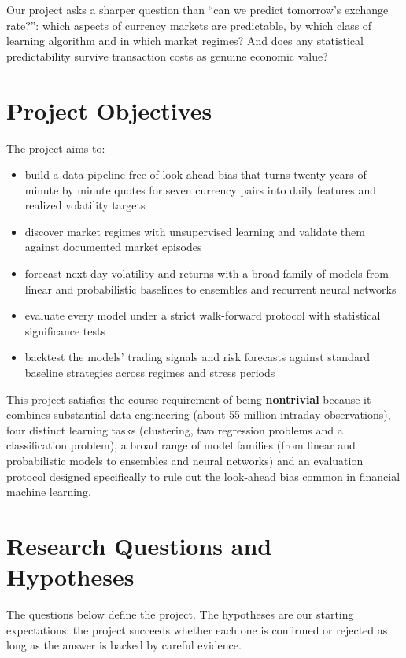 \documentclass[11pt,a4paper]{article}
\begin{document}
Our project asks a sharper question than ``can we predict tomorrow's exchange rate?'': which aspects of currency markets are predictable, by which class of learning algorithm and in which market regimes? And does any statistical predictability survive transaction costs as genuine economic value?

\section*{Project Objectives}
The project aims to:
\begin{itemize}
  \item build a data pipeline free of look-ahead bias that turns twenty years of minute by minute quotes for seven currency pairs into daily features and realized volatility targets
  \item discover market regimes with unsupervised learning and validate them against documented market episodes
  \item forecast next day volatility and returns with a broad family of models from linear and probabilistic baselines to ensembles and recurrent neural networks
  \item evaluate every model under a strict walk-forward protocol with statistical significance tests
  \item backtest the models' trading signals and risk forecasts against standard baseline strategies across regimes and stress periods
\end{itemize}
This project satisfies the course requirement of being \textbf{nontrivial} because it combines substantial data engineering (about 55 million intraday observations), four distinct learning tasks (clustering, two
regression problems and a classification problem), a broad range of model families (from linear and probabilistic models to ensembles and neural networks) and an evaluation protocol designed specifically to rule out the look-ahead bias common in
financial machine learning.

\section*{Research Questions and Hypotheses}
The questions below define the project. The hypotheses are our starting expectations: the project succeeds
whether each one is confirmed or rejected as long as the answer is backed by careful evidence.
\end{document}
